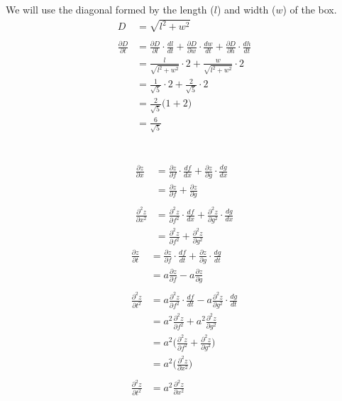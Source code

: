\documentclass{article}
\begin{document}
\subsection{} %
We will use the diagonal formed by the length ($l$) and width ($w$) of the box.
\begin{align*}
	D&=\sqrt{l^2+w^2}\\\\
	\frac{\partial{D}}{\partial{t}}
	&=\frac{\partial{D}}{\partial{l}}\cdot\frac{dl}{dt}
	+\frac{\partial{D}}{\partial{w}}\cdot\frac{dw}{dt}
	+\frac{\partial{D}}{\partial{h}}\cdot\frac{dh}{dt}\\
	&=\frac{l}{\sqrt{l^2+w^2}}\cdot2+\frac{w}{\sqrt{l^2+w^2}}\cdot2\\
	&=\frac{1}{\sqrt{5}}\cdot2+\frac{2}{\sqrt{5}}\cdot2\\
	&=\frac{2}{\sqrt{5}}\big(1+2\big)\\
	&=\frac{6}{\sqrt{5}}
\end{align*}
\section{} %
\begin{align*}
	\frac{\partial{z}}{\partial{x}}
	&=\frac{\partial{z}}{\partial{f}}\cdot\frac{df}{dx}
	+\frac{\partial{z}}{\partial{g}}\cdot\frac{dg}{dx}\\
	&=\frac{\partial{z}}{\partial{f}}
	+\frac{\partial{z}}{\partial{g}}\\\\
	\frac{\partial^2{z}}{\partial{x^2}}
	&=\frac{\partial^2{z}}{\partial{f^2}}\cdot\frac{df}{dx}
	+\frac{\partial^2{z}}{\partial{g^2}}\cdot\frac{dg}{dx}\\
	&=\frac{\partial^2{z}}{\partial{f^2}}
	+\frac{\partial^2{z}}{\partial{g^2}}
\end{align*}
\begin{align*}
	\frac{\partial{z}}{\partial{t}}
	&=\frac{\partial{z}}{\partial{f}}\cdot\frac{df}{dt}
	+\frac{\partial{z}}{\partial{g}}\cdot\frac{dg}{dt}\\
	&=a\frac{\partial{z}}{\partial{f}}
	-a\frac{\partial{z}}{\partial{g}}\\\\
	\frac{\partial^2{z}}{\partial{t^2}}
	&=a\frac{\partial^2{z}}{\partial{f^2}}\cdot\frac{df}{dt}
	-a\frac{\partial^2{z}}{\partial{g^2}}\cdot\frac{dg}{dt}\\
	&=a^2\frac{\partial^2{z}}{\partial{f^2}}
	+a^2\frac{\partial^2{z}}{\partial{g^2}}\\
	&=a^2\bigg(\frac{\partial^2{z}}{\partial{f^2}}
	+\frac{\partial^2{z}}{\partial{g^2}}\bigg)\\
	&=a^2\bigg(\frac{\partial^2{z}}{\partial{x^2}}\bigg)\\\\
	\frac{\partial^2{z}}{\partial{t^2}}
	&=a^2\frac{\partial^2{z}}{\partial{x^2}}
\end{align*}
\end{document}
